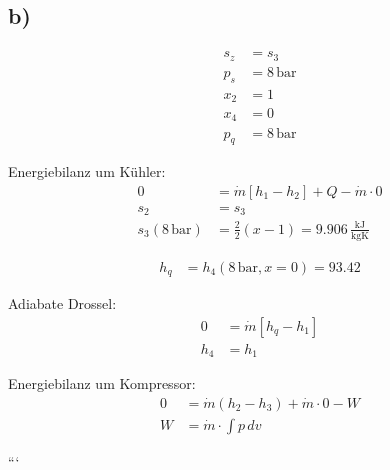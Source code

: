 

\subsection*{b)}

\begin{align*}
    s_z &= s_3 \\
    p_s &= 8 \, \text{bar} \\
    x_2 &= 1 \\
    x_4 &= 0 \\
    p_q &= 8 \, \text{bar}
\end{align*}

Energiebilanz um Kühler:
\begin{align*}
    0 &= \dot{m} [h_1 - h_2] + Q - \dot{m} \cdot 0 \\
    s_2 &= s_3 \\
    s_3(8 \, \text{bar}) &= \frac{2}{2} (x - 1) = 9.906 \, \frac{\text{kJ}}{\text{kgK}}
\end{align*}

\begin{align*}
    h_q &= h_{4}(8 \, \text{bar}, x = 0) = 93.42
\end{align*}

Adiabate Drossel:
\begin{align*}
    0 &= \dot{m} [h_q - h_1] \\
    h_4 &= h_1
\end{align*}

Energiebilanz um Kompressor:
\begin{align*}
    0 &= \dot{m} (h_2 - h_3) + \dot{m} \cdot 0 - W \\
    W &= \dot{m} \cdot \int p \, dv
\end{align*}

```